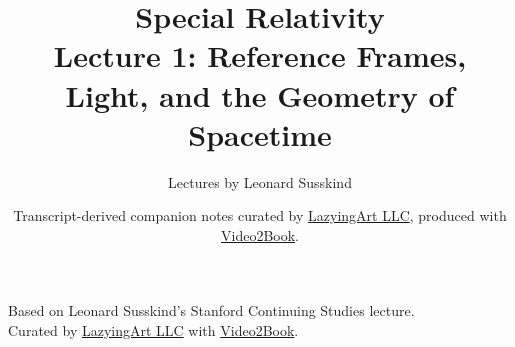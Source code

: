 \documentclass[11pt,oneside]{book}
\begin{document}
\frontmatter
\title{Special Relativity\\Lecture 1: Reference Frames, Light, and the Geometry of Spacetime}
\author{Lectures by Leonard Susskind}
\date{Transcript-derived companion notes curated by \href{https://lazying.art}{LazyingArt LLC}, produced with \href{https://github.com/lachlanchen/Video2Book}{Video2Book}.}
\maketitle
\setcounter{page}{2}
\begin{center}
\small Based on Leonard Susskind's Stanford Continuing Studies lecture.\\
Curated by \href{https://lazying.art}{LazyingArt LLC} with \href{https://github.com/lachlanchen/Video2Book}{Video2Book}.
\end{center}
\clearpage
\mainmatter

\end{document}
